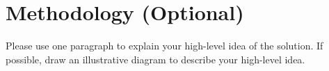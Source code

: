\section{Methodology (Optional)}
\label{section:algorithm}
Please use one paragraph to explain your high-level idea of the solution.
If possible, draw an illustrative diagram to describe your high-level idea.

